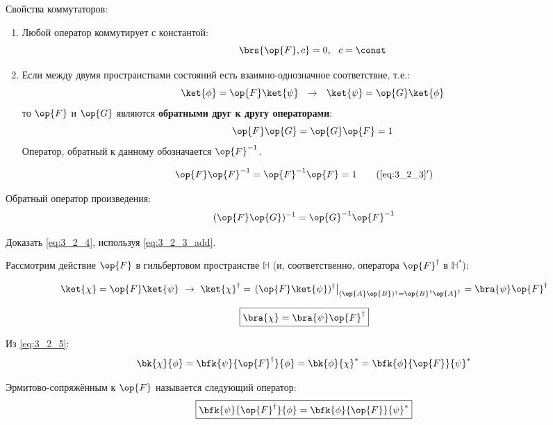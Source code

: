 Свойства коммутаторов:
\begin{enumerate}
\item Любой оператор коммутирует с константой:
$$
\brs{\op{F}, c} = 0,~~ c = \const
$$
\item Если между двумя пространствами состояний есть взаимно-однозначное соответствие, т.е.:
$$
\ket{\phi} = \op{F}\ket{\psi} ~~\to~~ \ket{\psi} = \op{G}\ket{\phi}
$$
то $\op{F}$ и $\op{G}$ являются \textbf{обратными друг к другу операторами}:
\begin{equation}
\label{eq:3_2_3}
\op{F}\op{G} = \op{G}\op{F} = 1
\end{equation}
Оператор, обратный к данному обозначается $\op{F}^{-1}$.
\end{enumerate}

\begin{equation}
\label{eq:3_2_3_add}
\op{F}\op{F}^{-1} = \op{F}^{-1}\op{F} = 1
\tag{\ref{eq:3_2_3}$'$}
\end{equation}

Обратный оператор произведения:
\begin{equation}
\label{eq:3_2_4}
(\op{F}\op{G})^{-1} = \op{G}^{-1} \op{F}^{-1}
\end{equation}

\begin{excr}
Доказать \eqref{eq:3_2_4}, используя \eqref{eq:3_2_3_add}.
\end{excr}

Рассмотрим действие $\op{F}$ в гильбертовом пространстве $\mathbb{H}$ (и, соответственно, оператора $\op{F}^\dag$ в $\mathbb{H}^*$):

$$
\ket{\chi} = \op{F}\ket{\psi} ~\to~ \ket{\chi}^\dag = \left. (\op{F}\ket{\psi})^\dag \right|_{(\op{A}\op{B})^\dag = \op{B}^\dag \op{A}^\dag} = \bra{\psi} \op{F}^\dag
$$

\begin{equation}
\label{eq:3_2_5}
\boxed{
	\bra{\chi} = \bra{\psi} \op{F}^\dag
}
\end{equation}

Из \eqref{eq:3_2_5}:
$$
\bk{\chi}{\phi} = \bfk{\psi}{\op{F}^\dag}{\phi} = \bk{\phi}{\chi}^* = \bfk{\phi}{\op{F}}{\psi}^*
$$

\begin{defn}
Эрмитово-сопряжённым к $\op{F}$ называется следующий оператор:
\begin{equation}
\label{eq:3_2_6}
\boxed{
	\bfk{\psi}{\op{F}^\dag}{\phi} = \bfk{\phi}{\op{F}}{\psi}^*
}
\end{equation}
\end{defn}

